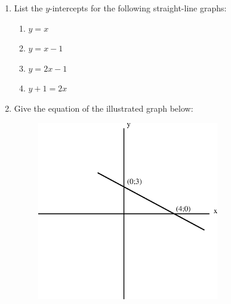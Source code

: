          
          \label{m39338*id239994}\begin{enumerate}[noitemsep, label=\textbf{\arabic*}. ] 
            \label{m39338*uid94}\item List the \begin{math}y\end{math}-intercepts for the following straight-line graphs:
\label{m39338*id240020}\begin{enumerate}[noitemsep, label=\textbf{\alph*}. ] 
            \label{m39338*uid95}\item \begin{math}y=x\end{math}\label{m39338*uid96}\item \begin{math}y=x-1\end{math}\label{m39338*uid97}\item \begin{math}y=2x-1\end{math}\label{m39338*uid98}\item \begin{math}y+1=2x\end{math}\end{enumerate}
                \label{m39338*uid99}\item Give the equation of the illustrated graph below:


    \setcounter{subfigure}{0}


	\begin{figure}[H] %
    \begin{center}
    \label{m39338*id240155!!!underscore!!!media}\label{m39338*id240155!!!underscore!!!printimage}\includegraphics[width=300px]{col11306.imgs/m39338_MG10C11_012.png} %
        

\end{center}
\end{figure}
\end{enumerate}
